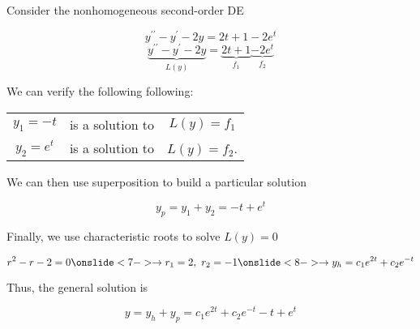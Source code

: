 \documentclass{beamer}
\begin{document}
\begin{frame}
\begin{example}
Consider the nonhomogeneous second-order DE

\vspace{-4mm}
\begin{overprint}
\begin{equation*}
y^{\prime\prime}-y^{\prime}-2y=2t+1-2e^{t}
\end{equation*}
\begin{equation*}
\underbrace{y^{\prime\prime}-y^{\prime}-2y}_{L(y)}=\underbrace{2t+1}_{f_1}\underbrace{-2e^{t}}_{f_2}
\end{equation*}
\end{overprint}

\vspace{1mm}
We can verify the following following:

\vspace{-3mm}
\begin{center}
\begin{tabular}{ccc}
$y_1=-t$  & is a solution to & $L(y)=f_1$\\
$y_2=e^t$ & is a solution to & $L(y)=f_2$.
\end{tabular}
\end{center}

\vspace{-1mm}
We can then use superposition to build a particular solution

\vspace{-3mm}
\begin{equation*}
y_p=y_1+y_2=-t+e^t
\end{equation*}

\vspace{-5mm}
Finally, we use characteristic roots to solve $L(y)=0$

\vspace{-3mm}
\begin{equation*}
r^2-r-2=0
\onslide<7->
\rightarrow r_1=2,\ r_2=-1
\onslide<8->
\rightarrow y_h=c_1e^{2t}+c_2e^{-t}
\end{equation*}

\vspace{-6mm}
Thus, the general solution is

\vspace{-4mm}
\begin{equation*}
y=y_h+y_p=c_1e^{2t}+c_2e^{-t}-t+e^t
\end{equation*}
\end{example}
\end{frame}
\end{document}
